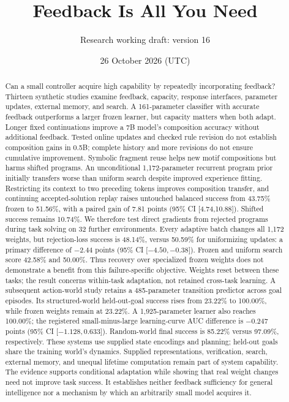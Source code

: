 \documentclass[11pt]{article}
\title{Feedback Is All You Need}
\author{Research working draft: version 16}
\date{26 October 2026 (UTC)}
\begin{document}
\maketitle
\begin{abstract}
Can a small controller acquire high capability by repeatedly incorporating
feedback? Thirteen synthetic studies examine feedback, capacity, response
interfaces, parameter updates, external memory, and search. A 161-parameter
classifier with accurate feedback outperforms a larger frozen learner, but
capacity matters when both adapt. Longer fixed continuations improve a 7B
model's composition accuracy without additional feedback. Tested online
updates and checked rule revision do not establish composition gains in 0.5B;
complete history and more revisions do not ensure cumulative improvement.
Symbolic fragment reuse helps new motif compositions but harms shifted
programs. An unconditional 1,172-parameter recurrent program prior initially
transfers worse than uniform search despite improved experience fitting.
Restricting its context to two preceding tokens improves composition transfer,
and continuing accepted-solution replay raises untouched balanced success
from 43.75\% frozen to 51.56\%, with a paired gain of 7.81 points
(95\% CI [4.74,10.88]). Shifted success remains 10.74\%.
We therefore test direct gradients from rejected programs during task solving
on 32 further environments. Every adaptive batch changes all 1,172 weights,
but rejection-loss success is 48.14\%, versus 50.59\% for uniformizing updates:
a primary difference of $-2.44$ points (95\% CI [$-4.50,-0.38$]). Frozen and
uniform search score 42.58\% and 50.00\%. Thus recovery over specialized frozen
weights does not demonstrate a benefit from this failure-specific objective.
Weights reset between these tasks; the result concerns within-task adaptation,
not retained cross-task learning. A subsequent action-world study retains a
485-parameter transition predictor across goal episodes. Its structured-world
held-out-goal success rises from 23.22\% to 100.00\%, while frozen weights
remain at 23.22\%. A 1,925-parameter learner also reaches 100.00\%; the
registered small-minus-large learning-curve AUC difference is $-0.247$ points
(95\% CI [$-1.128,0.633$]). Random-world final success is 85.22\% versus
97.09\%, respectively. These systems use supplied state encodings and planning;
held-out goals share the training world's dynamics. Supplied representations, verification,
search, external memory, and unequal lifetime computation remain part of
system capability. The evidence supports conditional adaptation while
showing that real weight changes need not improve task success. It establishes
neither feedback sufficiency for general intelligence nor a mechanism by which
an arbitrarily small model acquires it.
\end{abstract}
\end{document}
